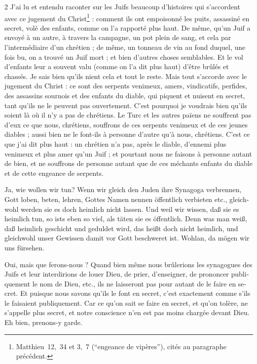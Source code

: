 \documentclass[a4paper,12pt]{article}
\newcommand\chunks[2]{%
\begin{leftcolumn*}\begin{otherlanguage}{german}%
{#1}%
\end{otherlanguage}\end{leftcolumn*}%
\begin{rightcolumn}\begin{otherlanguage}{french}%
{#2}%
\end{otherlanguage}\end{rightcolumn}%
}
\begin{document}
\begin{paracol}{2}
         {J’ai lu et entendu raconter sur les Juifs beaucoup d’histoires qui s’accordent avec ce jugement du Christ\footnote{Matthieu~12,~34 et 3,~7 (\enquote{engeance de vipères}), cités au paragraphe précédent.} : comment ils ont empoisonné les puits, assassiné en secret, volé des enfants, comme on l’a rapporté plus haut. De même, qu’un Juif a envoyé à un autre, à travers la campagne, un pot plein de sang, et cela par l’intermédiaire d’un chrétien ; de même, un tonneau de vin au fond duquel, une fois bu, on a trouvé un Juif mort ; et bien d’autres choses semblables. Et le vol d’enfants leur a souvent valu (comme on l’a dit plus haut) d’être brûlés et chassés. Je sais bien qu’ils nient cela et tout le reste. Mais tout s’accorde avec le jugement du Christ : ce sont des serpents venimeux, amers, vindicatifs, perfides, des assassins sournois et des enfants du diable, qui piquent et nuisent en secret, tant qu’ils ne le peuvent pas ouvertement. C’est pourquoi je voudrais bien qu’ils soient là où il n’y a pas de chrétiens. Le Turc et les autres païens ne souffrent pas d’eux ce que nous, chrétiens, souffrons de ces serpents venimeux et de ces jeunes diables ; aussi bien ne le font-ils à personne d’autre qu’à nous, chrétiens. C’est ce que j’ai dit plus haut : un chrétien n’a pas, après le diable, d’ennemi plus venimeux et plus amer qu’un Juif ; et pourtant nous ne faisons à personne autant de bien, et ne souffrons de personne autant que de ces méchants enfants du diable et de cette engeance de serpents.}
  \chunks{\textelp{}}
         {\textelp{}}
  \chunks{Ja, wie wollen wir tun? Wenn wir gleich den Juden ihre Synagoga verbrennen, Gott loben, beten, lehren, Gottes Namen nennen öffentlich verbieten etc., gleichwohl werden sie es doch heimlich nicht lassen. Und weil wir wissen, daß sie es heimlich tun, so ists eben so viel, als täten sie es öffentlich. Denn was man weiß, daß heimlich geschicht und geduldet wird, das heißt doch nicht heimlich, und gleichwohl unser Gewissen damit vor Gott beschweret ist. Wohlan, da mögen wir uns fürsehen.}
         {Oui, mais que ferons-nous ? Quand bien même nous brûlerions les synagogues des Juifs et leur interdirions de louer Dieu, de prier, d’enseigner, de prononcer publiquement le nom de Dieu, etc., ils ne laisseront pas pour autant de le faire en secret. Et puisque nous savons qu’ils le font en secret, c’est exactement comme s’ils le faisaient publiquement. Car ce qu’on sait se faire en secret, et qu’on tolère, ne s’appelle plus secret, et notre conscience n’en est pas moins chargée devant Dieu. Eh bien, prenons-y garde.}

\end{paracol}
\end{document}
